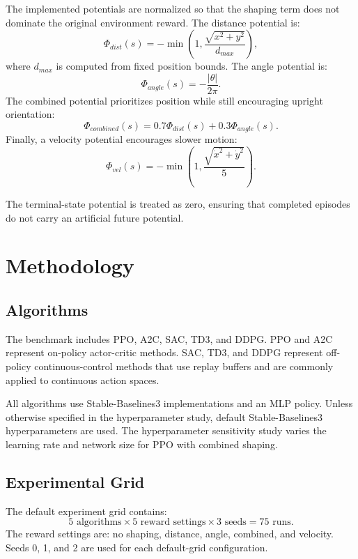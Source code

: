 \documentclass[conference,10pt]{IEEEtran}
\begin{document}
The implemented potentials are normalized so that the shaping term does not dominate the original environment reward. The distance potential is:
\begin{equation}
    \Phi_{dist}(s) = -\min\left(1, \frac{\sqrt{x^2+y^2}}{d_{max}}\right),
\end{equation}
where $d_{max}$ is computed from fixed position bounds. The angle potential is:
\begin{equation}
    \Phi_{angle}(s) = -\frac{|\theta|}{2\pi}.
\end{equation}
The combined potential prioritizes position while still encouraging upright orientation:
\begin{equation}
    \Phi_{combined}(s) = 0.7\Phi_{dist}(s) + 0.3\Phi_{angle}(s).
\end{equation}
Finally, a velocity potential encourages slower motion:
\begin{equation}
    \Phi_{vel}(s) = -\min\left(1, \frac{\sqrt{\dot{x}^2 + \dot{y}^2}}{5}\right).
\end{equation}

The terminal-state potential is treated as zero, ensuring that completed episodes do not carry an artificial future potential.

\section{Methodology}
\subsection{Algorithms}
The benchmark includes PPO, A2C, SAC, TD3, and DDPG. PPO and A2C represent on-policy actor-critic methods. SAC, TD3, and DDPG represent off-policy continuous-control methods that use replay buffers and are commonly applied to continuous action spaces.

All algorithms use Stable-Baselines3 implementations and an MLP policy. Unless otherwise specified in the hyperparameter study, default Stable-Baselines3 hyperparameters are used. The hyperparameter sensitivity study varies the learning rate and network size for PPO with combined shaping.

\subsection{Experimental Grid}
The default experiment grid contains:
\begin{equation}
    5 \text{ algorithms} \times 5 \text{ reward settings} \times 3 \text{ seeds} = 75 \text{ runs}.
\end{equation}
The reward settings are: no shaping, distance, angle, combined, and velocity. Seeds 0, 1, and 2 are used for each default-grid configuration.
\end{document}
